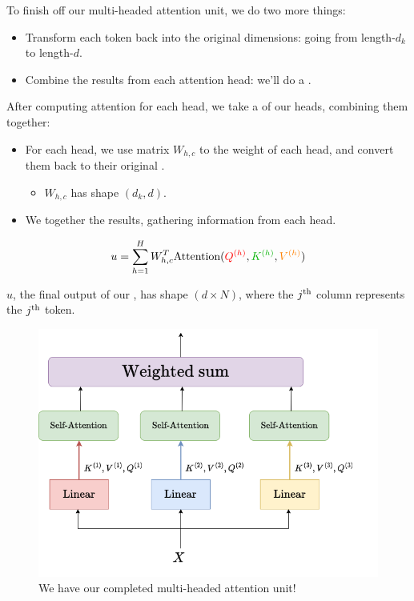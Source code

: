         To finish off our multi-headed attention unit, we do two more things:

        \begin{itemize}
            \item Transform each token back into the original dimensions: going from length-$d_k$ to length-$d$.
            \item Combine the results from each attention head: we'll do a .\\
        \end{itemize}

        \begin{kequation}
            After computing attention for each head, we take a  of our heads, combining them together:

            \begin{itemize}
                \item For each head, we use matrix $W_{h,c}$ to  the weight of each head, and convert them back to their original .
                    \begin{itemize}
                        \item $W_{h,c}$ has shape $(d_k, d)$.
                    \end{itemize}
                \item We  together the results, gathering information from each head.
            \end{itemize}

            $$u = \sum_{h=1}^{H} W_{h,c}^T \text{Attention}(\red{\ex{Q}{h}}, \grn{\ex{K}{h}}, \org{\ex{V}{h}})$$ 

            $u$, the final output of our , has shape $(d \times N)$, where the $j^{ \text{th} }$ column represents the $j^{ \text{th} }$ token.
        \end{kequation}

        \begin{figure}[H]
            \centering
            \includegraphics[width=0.5\linewidth]{images/transformers_images/multi_headed_attention_complete.png}
            \caption*{We have our completed multi-headed attention unit!}
        \end{figure}


